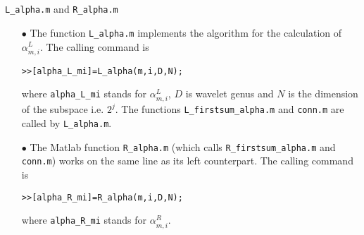 \documentclass[acmtoms]{acmtrans2m}
\begin{document}
\section{} \verb#L_alpha.m# and \verb#R_alpha.m# \\
\begin{itemize}
\item[$\bullet$]
The function \verb#L_alpha.m# implements the algorithm for the calculation of $\alpha^L_{m,i}$. The
calling command is
\begin{alltt}
>> [alpha_L_mi]=L_alpha(m,i,D,N);
\end{alltt}
where \verb#alpha_L_mi# stands for $\alpha^{L}_{m,i}$, $D$ is wavelet genus and $N$ is the dimension of the subspace i.e. $2^j$. The functions \verb#L_firstsum_alpha.m# and \verb#conn.m# are called by \verb#L_alpha.m#.
\item[$\bullet$]
The Matlab function
\verb#R_alpha.m# (which calls \verb#R_firstsum_alpha.m# and \verb#conn.m#) works on the same line as its left counterpart. The calling command is
\begin{alltt}
>> [alpha_R_mi]=R_alpha(m,i,D,N);
\end{alltt}
where \verb#alpha_R_mi# stands for $\alpha^{R}_{m,i}$.
\end{itemize}
\end{document}
